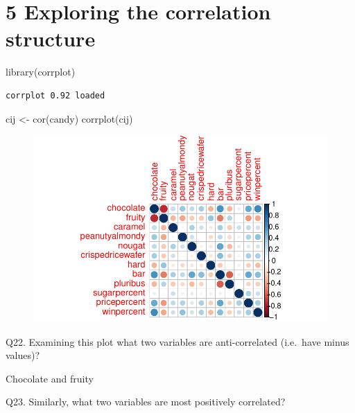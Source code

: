 \documentclass[
  letterpaper,
  DIV=11,
  numbers=noendperiod]{scrartcl}
\newenvironment{Shaded}{\begin{snugshade}}{\end{snugshade}}
\newcommand{\FunctionTok}[1]{\textcolor[rgb]{0.28,0.35,0.67}{#1}}
\newcommand{\NormalTok}[1]{\textcolor[rgb]{0.00,0.23,0.31}{#1}}
\newcommand{\OtherTok}[1]{\textcolor[rgb]{0.00,0.23,0.31}{#1}}
\begin{document}
\hypertarget{exploring-the-correlation-structure}{%
\section{5 Exploring the correlation
structure}\label{exploring-the-correlation-structure}}

\begin{Shaded}
\begin{Highlighting}[]
\FunctionTok{library}\NormalTok{(corrplot)}
\end{Highlighting}
\end{Shaded}

\begin{verbatim}
corrplot 0.92 loaded
\end{verbatim}

\begin{Shaded}
\begin{Highlighting}[]
\NormalTok{cij }\OtherTok{\textless{}{-}} \FunctionTok{cor}\NormalTok{(candy)}
\FunctionTok{corrplot}\NormalTok{(cij)}
\end{Highlighting}
\end{Shaded}

\begin{figure}[H]

{\centering \includegraphics{Class-9_files/figure-pdf/unnamed-chunk-26-1.pdf}

}

\end{figure}

Q22. Examining this plot what two variables are anti-correlated
(i.e.~have minus values)?

Chocolate and fruity

Q23. Similarly, what two variables are most positively correlated?
\end{document}
